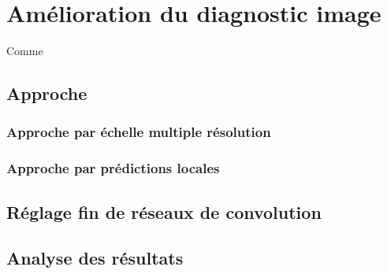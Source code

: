 \chapter{Amélioration du diagnostic image}
\label{chap:chapter_5}
\chapterintro
Comme 	
\newpage

\section{Approche}
\subsection{Approche par échelle multiple résolution}
\subsection{Approche par prédictions locales}
\section{Réglage fin de réseaux de convolution}
\section{Analyse des résultats}